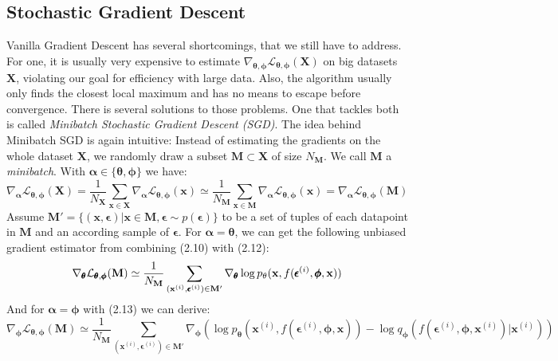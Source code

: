 \documentclass[12pt]{report}
\theoremstyle{definition}
\begin{document}
\subsection{Stochastic Gradient Descent} 
Vanilla Gradient Descent has several shortcomings, that we still have to address. For one, it is usually very expensive to estimate $\nabla_{\pmb{\theta}, \pmb{\phi}}\mathcal{L}_{\pmb{\theta}, \pmb{\phi}}(\mathbf{X})$ on big datasets $\mathbf{X}$, violating our goal for efficiency with large data. Also, the algorithm usually only finds the closest local maximum and has no means to escape before convergence. There is several solutions to those problems. One that tackles both is called \emph{Minibatch Stochastic Gradient Descent (SGD)}. 
The idea behind Minibatch SGD is again intuitive: Instead of estimating the gradients on the whole dataset $\mathbf{X}$, we randomly draw a subset $\mathbf{M} \subset \mathbf{X}$ of size $N_{\mathbf{M}}$. We call $\mathbf{M}$ a \emph{minibatch}. 
With $\pmb{\alpha} \in \{\pmb{\theta}, \pmb{\phi}\}$ we have:
\begin{equation}
\nabla_{\pmb{\alpha}}\mathcal{L}_{\pmb{\theta}, \pmb{\phi}}(\mathbf{X}) 
= \frac{1}{N_{\mathbf{X}}} \sum_{\mathbf{x} \in \mathbf{X}} \nabla_{\pmb{\alpha}} \mathcal{L}_{\mathbf{\theta}, \mathbf{\phi}}(\mathbf{x}) 
\simeq \frac{1}{N_{\mathbf{M}}} \sum_{\mathbf{x} \in \mathbf{M}} \nabla_{\pmb{\alpha}} \mathcal{L}_{\mathbf{\theta}, \mathbf{\phi}}(\mathbf{x})
= \nabla_{\pmb{\alpha}}\mathcal{L}_{\pmb{\theta}, \pmb{\phi}}(\mathbf{M}) 
\end{equation}
Assume $\mathbf{M}'=\{(\mathbf{x}, \pmb{\epsilon}) |  \mathbf{x} \in \mathbf{M}, \pmb{\epsilon} \sim p(\pmb{\epsilon})\}$ to be a set of tuples of each datapoint in $\mathbf{M}$ and an according sample of $\pmb{\epsilon}$. For $\pmb{\alpha} = \pmb{\theta}$, we can get the following unbiased gradient estimator from combining (2.10) with (2.12):
\begin{equation}
	\nabla_{\pmb{\theta}}\mathcal{L}_{\pmb{\theta}, \pmb{\phi}}(\mathbf{M}) 
	\simeq \frac{1}{N_{\mathbf{M}}} \sum_{(\mathbf{x}^{(i)}, \pmb{\epsilon}^{(i)}) \in \mathbf{M}'} \nabla_{\pmb{\theta}} \log p_{\mathbf{\theta}}(\mathbf{x}, f(\pmb{\epsilon}^{(i)}, \pmb{\phi}, \mathbf{x})) \\
\end{equation}
And for $\pmb{\alpha} = \pmb{\phi}$ with (2.13) we can derive:
\begin{equation}
\nabla_{\pmb{\phi}}\mathcal{L}_{\pmb{\theta}, \pmb{\phi}}(\mathbf{M}) 
	\simeq \frac{1}{N_{\mathbf{M}}} \sum_{(\mathbf{x}^{(i)}, \pmb{\epsilon}^{(i)}) \in \mathbf{M}'} \nabla_{\pmb{\phi}}(\log p_{\mathbf{\theta}}(\mathbf{x}^{(i)}, f(\pmb{\epsilon}^{(i)}, \pmb{\phi}, \mathbf{x})) - \log q_{\mathbf{\phi}}(f(\pmb{\epsilon}^{(i)}, \pmb{\phi}, \mathbf{x}^{(i)})|\mathbf{x}^{(i)}))
\end{equation}
\end{document}
